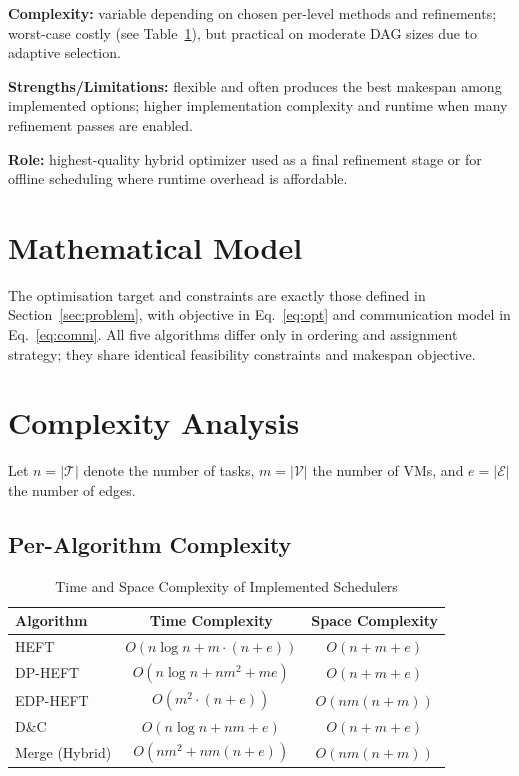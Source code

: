 \documentclass[conference]{IEEEtran}
\begin{document}
\textbf{Complexity:} variable depending on chosen per-level methods and
refinements; worst-case costly (see Table~\ref{tab:complexity}), but
practical on moderate DAG sizes due to adaptive selection.

\textbf{Strengths/Limitations:} flexible and often produces the best
makespan among implemented options; higher implementation complexity
and runtime when many refinement passes are enabled.

\textbf{Role:} highest-quality hybrid optimizer used as a final
refinement stage or for offline scheduling where runtime overhead is
affordable.
\section{Mathematical Model}
\label{sec:math}

The optimisation target and constraints are exactly those defined in
Section~\ref{sec:problem}, with objective in Eq.~\eqref{eq:opt} and
communication model in Eq.~\eqref{eq:comm}. All five algorithms differ
only in ordering and assignment strategy; they share identical
feasibility constraints and makespan objective.

\section{Complexity Analysis}
\label{sec:complexity}

Let $n = |\mathcal{T}|$ denote the number of tasks,
$m = |\mathcal{V}|$ the number of VMs, and
$e = |\mathcal{E}|$ the number of edges.

\subsection{Per-Algorithm Complexity}

\begin{table}[!t]
\caption{Time and Space Complexity of Implemented Schedulers}
\label{tab:complexity}
\centering
\begin{tabular}{lcc}
\toprule
\textbf{Algorithm} & \textbf{Time Complexity} & \textbf{Space Complexity} \\
\midrule
HEFT & $O(n\log n + m\cdot(n+e))$ & $O(n + m + e)$ \\
DP-HEFT & $O(n\log n + n m^2 + m e)$ & $O(n + m + e)$ \\
EDP-HEFT & $O(m^2\cdot(n+e))$ & $O(n m (n + m))$ \\
D\&C & $O(n\log n + n m + e)$ & $O(n + m + e)$ \\
Merge (Hybrid) & $O(n m^2 + n m (n+e))$ & $O(n m (n + m))$ \\
\bottomrule
\end{tabular}
\end{table}
\end{document}
